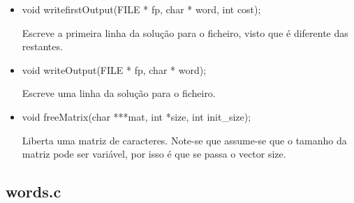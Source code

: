 \documentclass[a4paper, 11pt]{article}
\begin{document}
\begin{itemize}
    \item void writefirstOutput(FILE * fp, char * word, int cost);
    \par Escreve a primeira linha da solução para o ficheiro, visto que é diferente das restantes.
    
    \item void writeOutput(FILE * fp, char * word);
    \par Escreve uma linha da solução para o ficheiro.
    
    \item void freeMatrix(char ***mat, int *size, int init{\_}size);
    \par Liberta uma matriz de caracteres. Note-se que assume-se que o tamanho da matriz pode ser variável, por isso é que se passa o vector size.
    
    \end{itemize}

\subsection{words.c}
\end{document}
